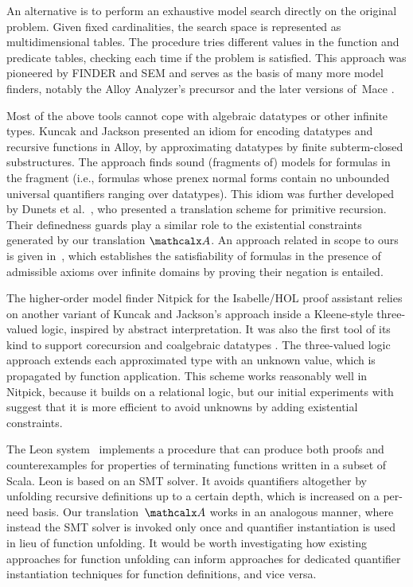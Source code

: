 An alternative is to perform
an exhaustive model search directly on the original problem. Given fixed
cardinalities, the search space is represented as multidimensional
tables. The procedure tries different values in the function and predicate
tables, checking each time if the problem is satisfied.
This approach was pioneered by FINDER
\cite{slaney-1994} and SEM \cite{zhang-zhang-1995} and serves as
the basis of many more model finders, notably the Alloy Analyzer's precursor
\cite{jackson-1996} and the later versions of~Mace
\cite{mccune-prover9-mace4}.

Most of the above tools cannot cope with algebraic datatypes or other infinite
types.
Kuncak and Jackson \cite{kuncak-jackson-2005} presented an idiom for
encoding datatypes and recursive functions in Alloy, by approximating datatypes
by finite subterm-closed substructures. The approach finds sound (fragments
of) models for formulas in the  fragment%
(i.e., formulas whose prenex normal forms contain no unbounded universal
quantifiers ranging over datatypes). This idiom was further developed by Dunets
et al.\ \cite{dunets-et-al-2010}, who presented a translation scheme
for primitive recursion. Their definedness guards play a similar role to the
existential constraints generated by our translation $\conv$.
An approach related in scope to ours is given in~\cite{baumgartner2013},
which establishes the satisfiability of formulas in the presence of admissible
axioms over infinite domains by proving their negation is entailed.

The higher-order model finder Nitpick \cite{blanchette-nipkow-2010}
for the Isabelle/HOL proof assistant
relies on another variant of Kuncak and Jackson's approach inside a
Kleene-style three-valued logic, inspired by abstract interpretation.
It was also the first tool of its kind to support corecursion and
coalgebraic datatypes \cite{blanchette-2013-relational}.
The three-valued logic approach extends each
approximated type with an unknown value, which is propagated by function
application. This scheme works reasonably well in Nitpick, because it builds
on a relational logic, but our initial experiments with \cvc suggest
that it is more efficient to avoid unknowns by adding existential
constraints.

The Leon system~\cite{blanc2013overview} implements a procedure that can
produce both proofs and counter\-examples for properties of terminating functions
written in a subset of Scala. Leon is based on an SMT solver. It avoids
quantifiers altogether by unfolding recursive definitions up to a certain
depth, which is increased on a per-need basis.
Our translation~$\conv$ works in an analogous manner, 
where instead the SMT solver is invoked only once 
and quantifier instantiation is used in lieu of function unfolding.
It would be
worth investigating how existing approaches for function
unfolding can inform approaches for dedicated quantifier instantiation
techniques for function definitions, and vice versa.


